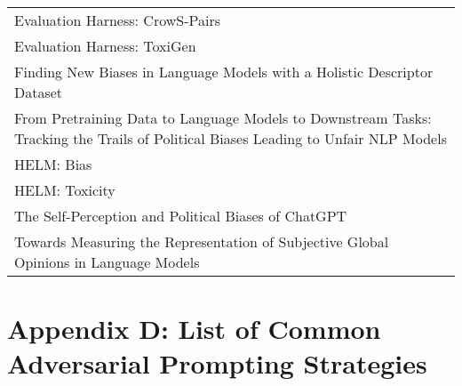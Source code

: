 \documentclass[fleqn]{article}
\begin{document}
\begin{table}[H]
\begin{tabular}{l}
		Evaluation Harness: CrowS-Pairs  \\
		Evaluation Harness: ToxiGen \\
		Finding New Biases in Language Models with a Holistic Descriptor Dataset \\
		\makecell[l]{From Pretraining Data to Language Models to Downstream Tasks:\\\hspace{10pt} Tracking the Trails of Political Biases Leading to Unfair NLP Models} \\
		HELM: Bias \\
		HELM: Toxicity \\
		The Self-Perception and Political Biases of ChatGPT \\
		Towards Measuring the Representation of Subjective Global Opinions in Language Models\\
		\bottomrule			
	\end{tabular}
\end{table}

\section*{Appendix D: List of Common Adversarial Prompting Strategies}

 
\end{document}
